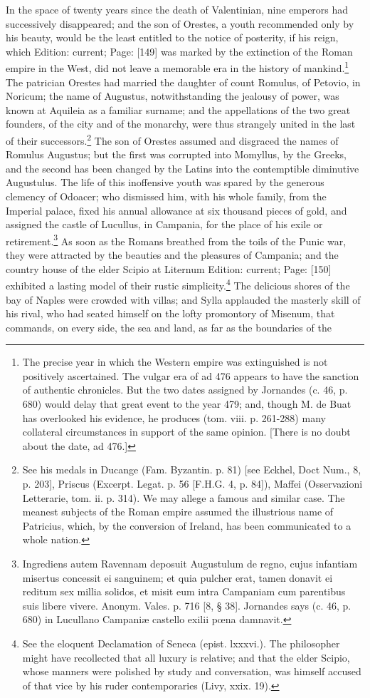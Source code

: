 In the space of twenty years since the death of Valentinian, nine emperors had successively disappeared; and the son of Orestes, a youth recommended only by his beauty, would be the least entitled to the notice of posterity, if his reign, which Edition: current; Page: [149] was marked by the extinction of the Roman empire in the West, did not leave a memorable era in the history of mankind.\footnote{The precise year in which the Western empire was extinguished is not positively ascertained. The vulgar era of ad 476 appears to have the sanction of authentic chronicles. But the two dates assigned by Jornandes (c. 46, p. 680) would delay that great event to the year 479; and, though M. de Buat has overlooked his evidence, he produces (tom. viii. p. 261-288) many collateral circumstances in support of the same opinion. [There is no doubt about the date, ad 476.]} The patrician Orestes had married the daughter of count Romulus, of Petovio, in Noricum; the name of Augustus, notwithstanding the jealousy of power, was known at Aquileia as a familiar surname; and the appellations of the two great founders, of the city and of the monarchy, were thus strangely united in the last of their successors.\footnote{See his medals in Ducange (Fam. Byzantin. p. 81) [see Eckhel, Doct Num., 8, p. 203], Priscus (Excerpt. Legat. p. 56 [F.H.G. 4, p. 84]), Maffei (Osservazioni Letterarie, tom. ii. p. 314). We may allege a famous and similar case. The meanest subjects of the Roman empire assumed the illustrious name of Patricius, which, by the conversion of Ireland, has been communicated to a whole nation.} The son of Orestes assumed and disgraced the names of Romulus Augustus; but the first was corrupted into Momyllus, by the Greeks, and the second has been changed by the Latins into the contemptible diminutive Augustulus. The life of this inoffensive youth was spared by the generous clemency of Odoacer; who dismissed him, with his whole family, from the Imperial palace, fixed his annual allowance at six thousand pieces of gold, and assigned the castle of Lucullus, in Campania, for the place of his exile or retirement.\footnote{Ingrediens autem Ravennam deposuit Augustulum de regno, cujus infantiam misertus concessit ei sanguinem; et quia pulcher erat, tamen donavit ei reditum sex millia solidos, et misit eum intra Campaniam cum parentibus suis libere vivere. Anonym. Vales. p. 716 [8, § 38]. Jornandes says (c. 46, p. 680) in Lucullano Campaniæ castello exilii pœna damnavit.} As soon as the Romans breathed from the toils of the Punic war, they were attracted by the beauties and the pleasures of Campania; and the country house of the elder Scipio at Liternum Edition: current; Page: [150] exhibited a lasting model of their rustic simplicity.\footnote{See the eloquent Declamation of Seneca (epist. lxxxvi.). The philosopher might have recollected that all luxury is relative; and that the elder Scipio, whose manners were polished by study and conversation, was himself accused of that vice by his ruder contemporaries (Livy, xxix. 19).} The delicious shores of the bay of Naples were crowded with villas; and Sylla applauded the masterly skill of his rival, who had seated himself on the lofty promontory of Misenum, that commands, on every side, the sea and land, as far as the boundaries of the 